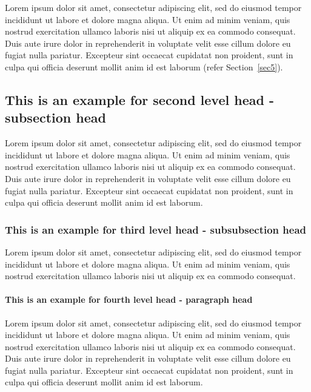 \documentclass[unnumsec,webpdf,modern,large]{oup-authoring-template}
\theoremstyle{thmstyleone}%
\theoremstyle{thmstyletwo}%
\theoremstyle{thmstylethree}%
\begin{document}
Lorem ipsum dolor sit amet, consectetur adipiscing elit, sed do eiusmod tempor incididunt ut labore et dolore magna aliqua. Ut enim ad minim veniam, quis nostrud exercitation ullamco laboris nisi ut aliquip ex ea commodo consequat. Duis aute irure dolor in reprehenderit in voluptate velit esse cillum dolore eu fugiat nulla pariatur. Excepteur sint occaecat cupidatat non proident, sunt in culpa qui officia deserunt mollit anim id est laborum (refer Section~\ref{sec5}).

\subsection{This is an example for second level head - subsection head}\label{subsec1}

Lorem ipsum dolor sit amet, consectetur adipiscing elit, sed do eiusmod tempor incididunt ut labore et dolore magna aliqua. Ut enim ad minim veniam, quis nostrud exercitation ullamco laboris nisi ut aliquip ex ea commodo consequat. Duis aute irure dolor in reprehenderit in voluptate velit esse cillum dolore eu fugiat nulla pariatur. Excepteur sint occaecat cupidatat non proident, sunt in culpa qui officia deserunt mollit anim id est laborum.

\subsubsection{This is an example for third level head - subsubsection head}\label{subsubsec1}

Lorem ipsum dolor sit amet, consectetur adipiscing elit, sed do
eiusmod tempor incididunt ut labore et dolore magna aliqua. Ut enim ad minim veniam, quis nostrud exercitation ullamco laboris nisi ut aliquip ex ea commodo consequat. %

\paragraph{This is an example for fourth level head - paragraph head}

Lorem ipsum dolor sit amet, consectetur adipiscing elit, sed do eiusmod tempor incididunt ut labore et dolore magna aliqua. Ut enim ad minim veniam, quis nostrud exercitation ullamco laboris nisi ut aliquip ex ea commodo consequat. Duis aute irure dolor in reprehenderit in voluptate velit esse cillum dolore eu fugiat nulla pariatur. Excepteur sint occaecat cupidatat non proident, sunt in culpa qui officia deserunt mollit anim id est laborum.
\end{document}

